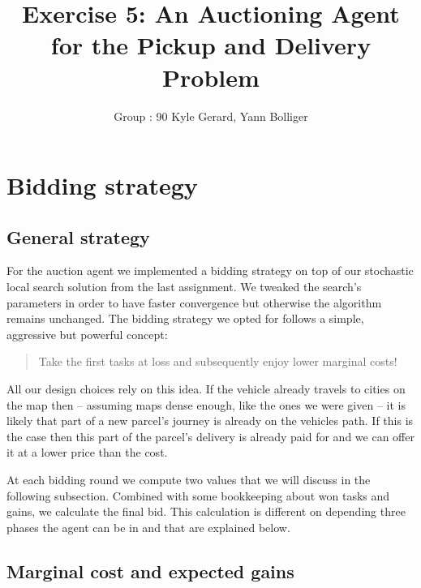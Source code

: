 \documentclass[11pt]{article}
\title{\bf Exercise 5: An Auctioning Agent for the Pickup and Delivery Problem}
\author{Group \textnumero : 90  Kyle Gerard, Yann Bolliger}
\begin{document}
  \maketitle

  \section{Bidding strategy}


  \subsection{General strategy}

  For the auction agent we implemented a bidding strategy on top of our stochastic
  local search solution from the last assignment. We tweaked the search's
  parameters in order to have faster convergence but otherwise the algorithm
  remains unchanged. The bidding strategy we opted for follows a simple,
  aggressive but powerful concept:

  \begin{quotation}
    Take the first tasks at loss and subsequently enjoy lower marginal costs!
  \end{quotation}

  All our design choices rely on this idea. If the vehicle already travels to
  cities on the map then -- assuming maps dense enough, like the ones we were
  given -- it is likely that part of a new parcel's journey is already on the
  vehicles path. If this is the case then this part of the parcel's delivery is
  already paid for and we can offer it at a lower price than the cost.

  At each bidding round we compute two values that we will discuss in the
  following subsection. Combined with some bookkeeping about won tasks and
  gains, we calculate the final bid. This calculation is different on depending
  three phases the agent can be in and that are explained below.


  \subsection{Marginal cost and expected gains}
\end{document}
